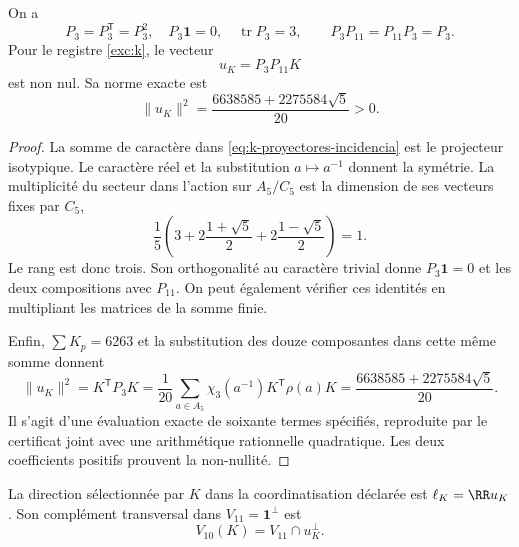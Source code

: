 \begin{lemma}
\label{lem:k-sector-no-nulo}
On a
\[
 P_3=P_3^{\mathsf T}=P_3^2,\quad
 P_3\mathbf1=0,\quad \operatorname{tr}P_3=3,
 \qquad P_3P_{11}=P_{11}P_3=P_3.
\]
Pour le registre \eqref{exc:k}, le vecteur
\begin{equation}
 u_K=P_3P_{11}K
 \label{eq:k-vector-direccional}
\end{equation}
est non nul. Sa norme exacte est
\begin{equation}
 \lVert u_K\rVert^2
 =\frac{6638585+2275584\sqrt5}{20}>0.
 \label{eq:k-norma-direccion}
\end{equation}
\end{lemma}
\begin{proof}
La somme de caractère dans \eqref{eq:k-proyectores-incidencia} est le
projecteur isotypique. Le caractère réel et la substitution \(a\mapsto a^{-1}\)
donnent la symétrie. La multiplicité du secteur dans l'action sur
\(A_5/C_5\) est la dimension de ses vecteurs fixes par \(C_5\),
\[
 \frac15\left(3+2\frac{1+\sqrt5}{2}
                 +2\frac{1-\sqrt5}{2}\right)=1.
\]
Le rang est donc trois. Son orthogonalité au caractère trivial donne \(P_3\mathbf1=0\) et les deux compositions avec \(P_{11}\). On peut également vérifier ces identités en multipliant les matrices de la somme finie.

Enfin, \(\sum K_p=6263\) et la substitution des douze
composantes dans cette même somme donnent
\[
 \lVert u_K\rVert^2=K^{\mathsf T}P_3K
 =\frac1{20}\sum_{a\in A_5}
                \chi_3(a^{-1})K^{\mathsf T}\rho(a)K
 =\frac{6638585+2275584\sqrt5}{20}.
\]
Il s'agit d'une évaluation exacte de soixante termes spécifiés,
reproduite par le certificat joint avec une arithmétique rationnelle
quadratique. Les deux coefficients positifs prouvent la non-nullité.
\end{proof}

\begin{definition}
La direction sélectionnée par \(K\) dans la coordinatisation déclarée est
\(\ell_K=\RR u_K\). Son complément transversal dans
\(V_{11}=\mathbf1^\perp\) est
\[
 V_{10}(K)=V_{11}\cap u_K^\perp.
\]
\end{definition}

